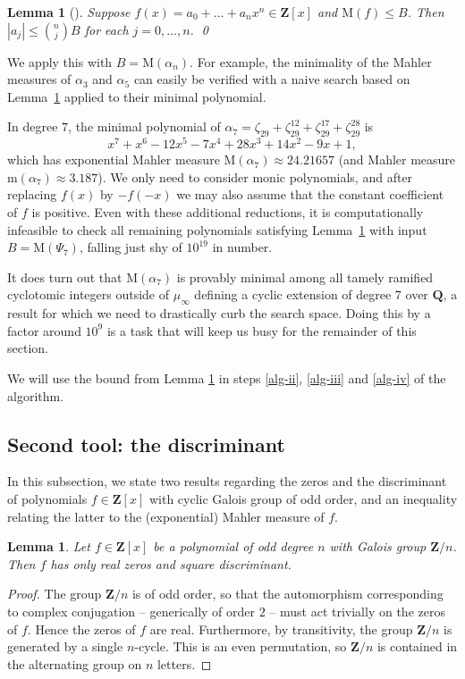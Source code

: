 \documentclass[12pt,reqno]{amsart}
\theoremstyle{definition}
\theoremstyle{plain}
\newtheorem{lemma}[theorem]{Lemma}
\theoremstyle{definition}
\newcommand{\Z}{\mathbf{Z}}
\newcommand{\Q}{\mathbf{Q}}
\newcommand\m{\mathrm{m}}
\newcommand{\MM}{\mathrm{M}}
\renewcommand{\leq}{\leqslant}
\begin{document}
\begin{lemma}[{\cite[Lemma~1.6]{BrunaultZudilin}}]
\label{lem:Mahler coefficient bound}
Suppose $f(x) = a_0 + \dots + a_n x^n \in \Z[x]$ and $\MM(f) \leq B$. Then $|a_{j}| \leq \binom{n}{j} B$ for each $j=0,\dots,n$. \hfill \qed
\end{lemma}

We apply this with $B=\MM(\alpha_n)$. For example, the minimality of the Mahler measures of $\alpha_3$ and $\alpha_5$ can easily be verified with a naive search based on Lemma~\ref{lem:Mahler coefficient bound} applied to their minimal polynomial. 

In degree $7$, the minimal polynomial of $\alpha_7 = \zeta_{29}+ \zeta^{12}_{29} + \zeta^{17}_{29} + \zeta^{28}_{29}$ is
\begin{equation*}
x^7 + x^6 - 12x^5 - 7x^4 + 28x^3 + 14x^2 - 9x + 1,
\end{equation*}
which has exponential Mahler measure $ \MM(\alpha_7) \approx 24.21657$ (and Mahler measure $\m(\alpha_7) \approx 3.187$). We only need to consider monic polynomials, and after replacing $f(x)$ by $-f(-x)$ we may also assume that the constant coefficient of $f$ is positive. Even with these additional reductions, it is computationally infeasible to check all remaining polynomials satisfying Lemma~\ref{lem:Mahler coefficient bound} with input $B = \MM(\Psi_7)$, falling just shy of $10^{19}$ in number. 

It does turn out that $\MM(\alpha_7)$ is provably minimal among all tamely ramified cyclotomic integers outside of $\mu_{\infty}$ defining a cyclic extension of degree $7$ over $\Q$, a result for which we need to drastically curb the search space. Doing this by a factor around $10^{9}$ is a task that will keep us busy for the remainder of this section.  

We will use the bound from Lemma \ref{lem:Mahler coefficient bound} in steps \eqref{alg-ii}, \eqref{alg-iii} and \eqref{alg-iv} of the algorithm.  

\subsection{Second tool: the discriminant} 
 In this subsection, we state two results regarding the zeros and the discriminant of polynomials $f \in \Z[x]$ with cyclic Galois group of odd order, and an inequality relating the latter to the (exponential) Mahler measure of $f$. 
 
 \begin{lemma}
\label{lem:Cn real roots}
Let $f \in \Z[x]$ be a polynomial of odd degree $n$ with Galois group $\Z/n$. Then $f$ has only real zeros and square discriminant.
\end{lemma}
\begin{proof}
The group $\Z/n$ is of odd order, so that the automorphism corresponding to complex conjugation -- generically of order $2$ -- must act trivially on the zeros of $f$. Hence the zeros of $f$ are real. Furthermore, by transitivity, the group $\Z/n$ is generated by a single $n$-cycle. This is an even permutation, so $\Z/n$ is contained in the alternating group on $n$ letters. 
\end{proof}
\end{document}
